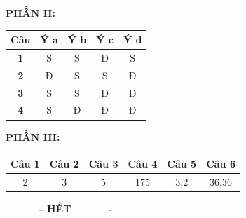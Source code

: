 \documentclass[12pt,a4paper]{article}
\begin{document}
\noindent\textbf{PHẦN II:}
\begin{center}
\begin{tabular}{|c|c|c|c|c|}
\hline
\textbf{Câu} & \textbf{Ý a} & \textbf{Ý b} & \textbf{Ý c} & \textbf{Ý d} \\ \hline
\textbf{1} & S & S & Đ & S \\ \hline
\textbf{2} & Đ & S & S & Đ \\ \hline
\textbf{3} & S & S & Đ & Đ \\ \hline
\textbf{4} & S & Đ & Đ & Đ \\ \hline
\end{tabular}
\end{center}

\noindent\textbf{PHẦN III:}
\begin{center}
\begin{tabular}{|c|c|c|c|c|c|}
\hline
\textbf{Câu 1} & \textbf{Câu 2} & \textbf{Câu 3} & \textbf{Câu 4} & \textbf{Câu 5} & \textbf{Câu 6} \\ \hline
2 & 3 & 5 & 175 & 3,2 & 36,36 \\ \hline
\end{tabular}
\end{center}

\begin{center}
	\textbf{---------- HẾT ----------}
\end{center}
\end{document}
